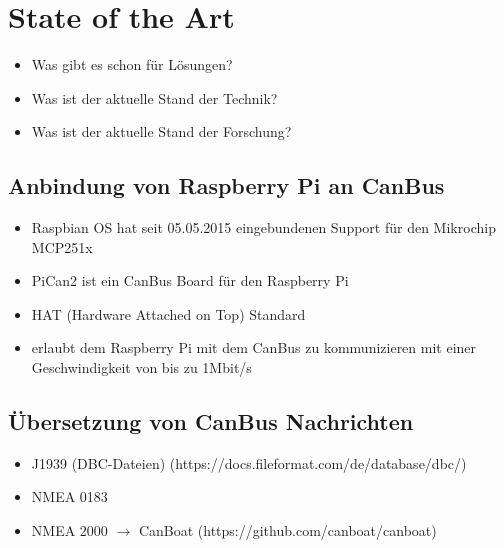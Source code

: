 \section{State of the Art}
\begin{itemize}
    \item Was gibt es schon für Lösungen?
    \item Was ist der aktuelle Stand der Technik?
    \item Was ist der aktuelle Stand der Forschung?
\end{itemize}
\subsection{Anbindung von Raspberry Pi an CanBus}
\begin{itemize}
    \item Raspbian OS hat seit 05.05.2015 eingebundenen Support für den Mikrochip MCP251x
\end{itemize}
\cite{Salunkhe2016}
\begin{itemize}
    \item PiCan2 ist ein CanBus Board für den Raspberry Pi
    \item HAT (Hardware Attached on Top) Standard
    \item erlaubt dem Raspberry Pi mit dem CanBus zu kommunizieren mit einer Geschwindigkeit von bis zu 1Mbit/s
\end{itemize}
\cite{Pant2019}
\subsection{Übersetzung von CanBus Nachrichten}
\begin{itemize}
    \item J1939 (DBC-Dateien) (https://docs.fileformat.com/de/database/dbc/)
    \item NMEA 0183 
    \item NMEA 2000 $\rightarrow$ CanBoat (https://github.com/canboat/canboat)
\end{itemize}